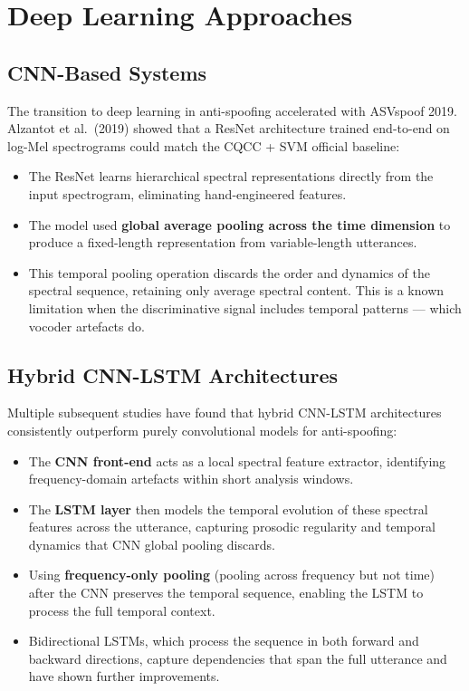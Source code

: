 \documentclass[12pt,a4paper]{article}
\begin{document}
\section{Deep Learning Approaches}

\subsection{CNN-Based Systems}

The transition to deep learning in anti-spoofing accelerated with ASVspoof 2019.
Alzantot et al.\ (2019) showed that a ResNet architecture trained end-to-end on log-Mel
spectrograms could match the CQCC + SVM official baseline:

\begin{itemize}
  \item The ResNet learns hierarchical spectral representations directly from the input
    spectrogram, eliminating hand-engineered features.
  \item The model used \textbf{global average pooling across the time dimension} to
    produce a fixed-length representation from variable-length utterances.
  \item This temporal pooling operation discards the order and dynamics of the spectral
    sequence, retaining only average spectral content. This is a known limitation when
    the discriminative signal includes temporal patterns --- which vocoder artefacts do.
\end{itemize}

\subsection{Hybrid CNN-LSTM Architectures}

Multiple subsequent studies have found that hybrid CNN-LSTM architectures consistently
outperform purely convolutional models for anti-spoofing:

\begin{itemize}
  \item The \textbf{CNN front-end} acts as a local spectral feature extractor, identifying
    frequency-domain artefacts within short analysis windows.
  \item The \textbf{LSTM layer} then models the temporal evolution of these spectral
    features across the utterance, capturing prosodic regularity and temporal dynamics
    that CNN global pooling discards.
  \item Using \textbf{frequency-only pooling} (pooling across frequency but not time)
    after the CNN preserves the temporal sequence, enabling the LSTM to process the
    full temporal context.
  \item Bidirectional LSTMs, which process the sequence in both forward and backward
    directions, capture dependencies that span the full utterance and have shown
    further improvements.
\end{itemize}
\end{document}
